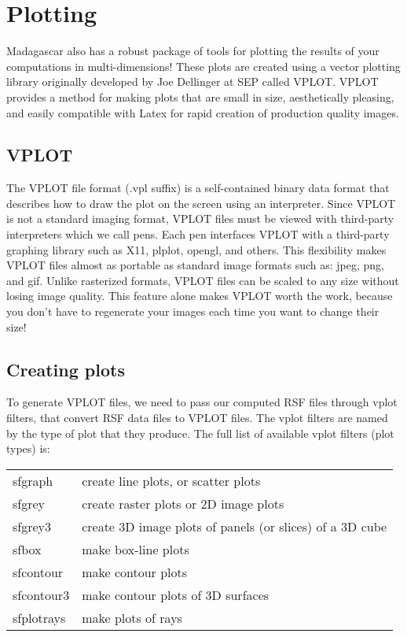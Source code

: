\section{Plotting}

Madagascar also has a robust package of tools for plotting the results of your computations in multi-dimensions! These plots are created using a vector plotting library originally developed by Joe Dellinger at SEP called VPLOT. VPLOT provides a method for making plots that are small in size, aesthetically pleasing, and easily compatible with Latex for rapid creation of production quality images.

\subsection{VPLOT}
The VPLOT file format (.vpl suffix) is a self-contained binary data format that describes how to draw the plot on the screen using an interpreter. Since VPLOT is not a standard imaging format, VPLOT files must be viewed with third-party interpreters which we call pens. Each pen interfaces VPLOT with a third-party graphing library such as X11, plplot, opengl, and others. This flexibility makes VPLOT files almost as portable as standard image formats such as: jpeg, png, and gif. Unlike rasterized formats, VPLOT files can be scaled to any size without losing image quality. This feature alone makes VPLOT worth the work, because you don't have to regenerate your images each time you want to change their size!

\subsection{Creating plots}
To generate VPLOT files, we need to pass our computed RSF files through vplot filters, that convert RSF data files to VPLOT files. The vplot filters are named by the type of plot that they produce. The full list of available vplot filters (plot types) is:

\begin{center}
\begin{table}
    \begin{tabularx}{0.8\textwidth}{|l |X| }
    \hline 
sfgraph & create line plots, or scatter plots \\
sfgrey & create raster plots or 2D image plots \\
sfgrey3 & create 3D image plots of panels (or slices) of a 3D cube \\
sfbox & make box-line plots \\
sfcontour & make contour plots \\
sfcontour3 & make contour plots of 3D surfaces \\
sfplotrays & make plots of rays \\
\hline 
\end{tabularx}
\end{table}
\end{center}



